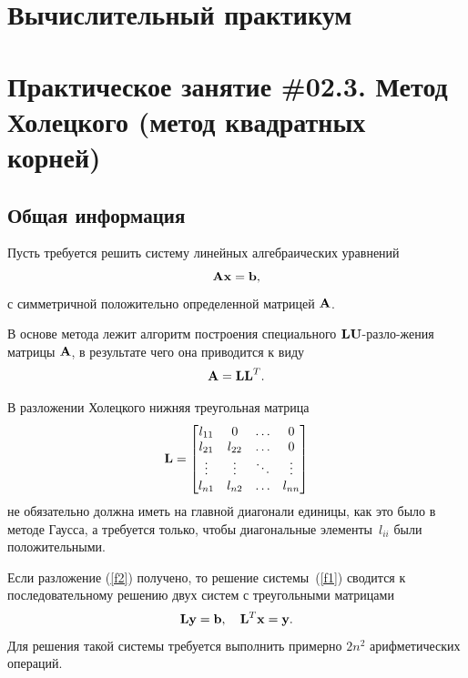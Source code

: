 \documentclass[12pt]{article}
\begin{document}
    \begin{flushright}
    \end{flushright}
     \begin{flushright}
    \end{flushright}
    \section*{Вычислительный практикум}
    \section*{Практическое занятие \#02.3. Метод Холецкого (метод квадратных корней)}

    \subsection*{Общая информация}

    Пусть требуется решить систему линейных алгебраических уравнений
    \begin{equation}
        \bold{A}\bold{x}=\bold{b},\label{f1}
    \end{equation}
    с симметричной положительно определенной матрицей $\bold{A}$.

    В основе метода лежит алгоритм построения специального $\bold{LU}$-разло-\linebreak жения матрицы $\bold{A}$, в результате чего она приводится к виду
    \begin{equation}
        \bold{A}=\bold{LL}^{T}.\label{f2}
    \end{equation}

    В разложении Холецкого нижняя треугольная матрица
    \begin{equation}
        \bold{L}=
        \begin{bmatrix}
            l_{11} & 0 & \ldots & 0 \\
            l_{21} & l_{22} & \ldots & 0 \\
            \vdots & \vdots & \ddots & \vdots \\
            l_{n1} & l_{n2} & \ldots & l_{nn}
        \end{bmatrix}
    \end{equation}
    не обязательно должна иметь на главной диагонали единицы, как это было в методе Гаусса, а требуется только, чтобы диагональные элементы~$l_{ii}$ были положительными.

    Если разложение (\ref{f2}) получено, то решение системы~(\ref{f1}) сводится к последовательному решению двух систем с треугольными матрицами
    \begin{equation}
        \bold{L}\bold{y}=\bold{b},\quad \bold{L}^{T}\bold{x}=\bold{y}.\label{f4}
    \end{equation}
    Для решения такой системы требуется выполнить примерно $2n^2$ арифметических операций.
\end{document}
